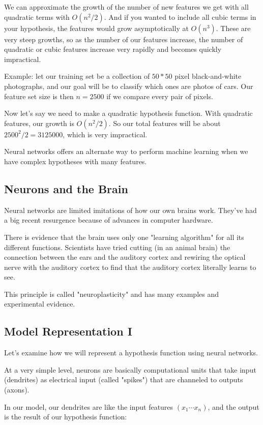 \documentclass{article}
\begin{document}
We can approximate the growth of the number of new features we get with all quadratic terms with $O(n^2/2)$. And if you wanted to include all cubic terms in your hypothesis, the features would grow asymptotically at $O(n^3)$. These are very steep growths, so as the number of our features increase, the number of quadratic or cubic features increase very rapidly and becomes quickly impractical.

Example: let our training set be a collection of $50*50$ pixel black-and-white photographs, and our goal will be to classify which ones are photos of cars. Our feature set size is then $n=2500$ if we compare every pair of pixels.

Now let's say we need to make a quadratic hypothesis function. With quadratic features, our growth is $O(n^2/2)$. So our total features will be about $2500^2/2=3125000$, which is very impractical.

Neural networks offers an alternate way to perform machine learning when we have complex hypotheses with many features.
\subsection{Neurons and the Brain}

Neural networks are limited imitations of how our own brains work. They've had a big recent resurgence because of advances in computer hardware.

There is evidence that the brain uses only one "learning algorithm" for all its different functions. Scientists have tried cutting (in an animal brain) the connection between the ears and the auditory cortex and rewiring the optical nerve with the auditory cortex to find that the auditory cortex literally learns to see.

This principle is called "neuroplasticity" and has many examples and experimental evidence.
\subsection{Model Representation I}

Let's examine how we will represent a hypothesis function using neural networks.

At a very simple level, neurons are basically computational units that take input (dendrites) as electrical input (called "spikes") that are channeled to outputs (axons).

In our model, our dendrites are like the input features $(x_1 \cdots x_n)$, and the output is the result of our hypothesis function:
\end{document}
